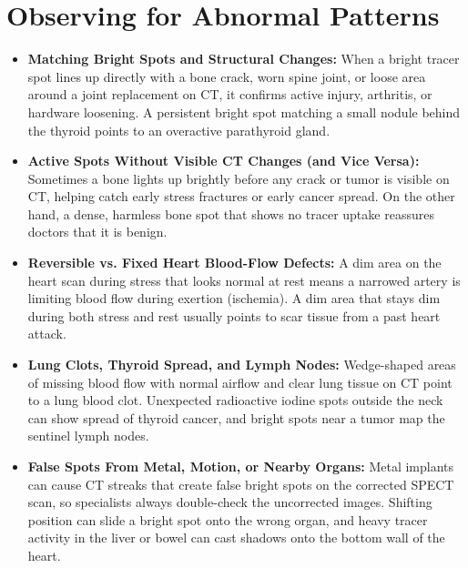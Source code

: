 \section{Observing for Abnormal Patterns}
\begin{itemize}
    \item \textbf{Matching Bright Spots and Structural Changes:} When a bright tracer spot lines up directly with a bone crack, worn spine joint, or loose area around a joint replacement on CT, it confirms active injury, arthritis, or hardware loosening. A persistent bright spot matching a small nodule behind the thyroid points to an overactive parathyroid gland.
    \item \textbf{Active Spots Without Visible CT Changes (and Vice Versa):} Sometimes a bone lights up brightly before any crack or tumor is visible on CT, helping catch early stress fractures or early cancer spread. On the other hand, a dense, harmless bone spot that shows no tracer uptake reassures doctors that it is benign.
    \item \textbf{Reversible vs. Fixed Heart Blood-Flow Defects:} A dim area on the heart scan during stress that looks normal at rest means a narrowed artery is limiting blood flow during exertion (ischemia). A dim area that stays dim during both stress and rest usually points to scar tissue from a past heart attack.
    \item \textbf{Lung Clots, Thyroid Spread, and Lymph Nodes:} Wedge-shaped areas of missing blood flow with normal airflow and clear lung tissue on CT point to a lung blood clot. Unexpected radioactive iodine spots outside the neck can show spread of thyroid cancer, and bright spots near a tumor map the sentinel lymph nodes.
    \item \textbf{False Spots From Metal, Motion, or Nearby Organs:} Metal implants can cause CT streaks that create false bright spots on the corrected SPECT scan, so specialists always double-check the uncorrected images. Shifting position can slide a bright spot onto the wrong organ, and heavy tracer activity in the liver or bowel can cast shadows onto the bottom wall of the heart.
\end{itemize}


